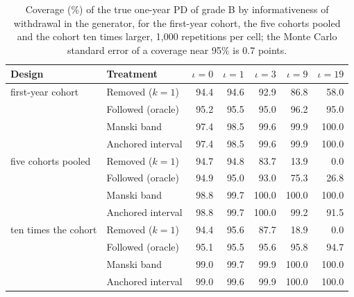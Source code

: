 \begin{table}[htbp]
\centering
\small
\caption{Coverage (\%) of the true one-year PD of grade B by informativeness of withdrawal in the generator, for the first-year cohort, the five cohorts pooled and the cohort ten times larger, 1,000 repetitions per cell; the Monte Carlo standard error of a coverage near 95\% is 0.7 points.}
\label{tab:grid}
\begin{tabular}{llrrrrr}
\toprule
Design & Treatment & $\iota=0$ & $\iota=1$ & $\iota=3$ & $\iota=9$ & $\iota=19$ \\
\midrule
first-year cohort & \relax Removed ($k=1$) & 94.4 & 94.6 & 92.9 & 86.8 & 58.0 \\
 & Followed (oracle) & 95.2 & 95.5 & 95.0 & 96.2 & 95.0 \\
 & Manski band & 97.4 & 98.5 & 99.6 & 99.9 & 100.0 \\
 & Anchored interval & 97.4 & 98.5 & 99.6 & 99.9 & 100.0 \\
five cohorts pooled & \relax Removed ($k=1$) & 94.7 & 94.8 & 83.7 & 13.9 & 0.0 \\
 & Followed (oracle) & 94.9 & 95.0 & 93.0 & 75.3 & 26.8 \\
 & Manski band & 98.8 & 99.7 & 100.0 & 100.0 & 100.0 \\
 & Anchored interval & 98.8 & 99.7 & 100.0 & 99.2 & 91.5 \\
ten times the cohort & \relax Removed ($k=1$) & 94.4 & 95.6 & 87.7 & 18.9 & 0.0 \\
 & Followed (oracle) & 95.1 & 95.5 & 95.6 & 95.8 & 94.7 \\
 & Manski band & 99.0 & 99.7 & 99.9 & 100.0 & 100.0 \\
 & Anchored interval & 99.0 & 99.6 & 99.9 & 100.0 & 100.0 \\
\bottomrule
\end{tabular}
\end{table}

